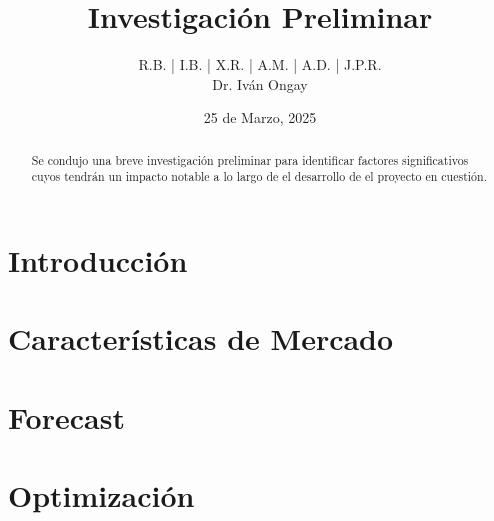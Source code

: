 \documentclass{article}
\title{\textbf{Investigación Preliminar}}
\author{R.B. | I.B. | X.R. | A.M. | A.D. | J.P.R. \\ Dr. Iván Ongay}
\date{25 de Marzo, 2025}
\begin{document}
\pagecolor{black} 
\color{white}
\maketitle


\begin{abstract}
    Se condujo una breve investigación preliminar para identificar factores significativos cuyos tendrán un impacto notable a lo largo de el desarrollo de el proyecto en cuestión. 
\end{abstract}

\begin{Large}
\tableofcontents
\end{Large}%
\pagebreak

\section{Introducción} \label{sec:intro}


\section{Características de Mercado} \label{sec:caracmerc}


\section{Forecast} \label{sec:forecasting}


\section{Optimización} \label{sec:optimiz}


 
\end{document}
